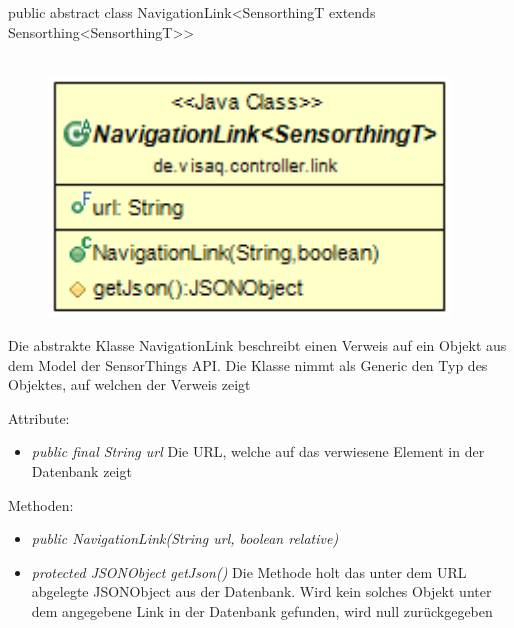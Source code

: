 public abstract class NavigationLink<SensorthingT extends Sensorthing<SensorthingT>>
\\\\
\begin{minipage}{0.3\textwidth}
    \begin{figure}[H]
        {\centering\includegraphics[width=0.95\textwidth]{media/backend/controller/classes/NavigationLink.png}}
    \end{figure}
    \end{minipage} \hfill
\begin{minipage}{0.7\textwidth}
    Die abstrakte Klasse NavigationLink beschreibt einen Verweis auf ein Objekt aus dem Model der \gls{SensorThings API}.
    Die Klasse nimmt als Generic den Typ des Objektes, auf welchen der Verweis zeigt
\end{minipage}

Attribute:
\begin{itemize}
    \item \emph{public final String url} Die URL, welche auf das verwiesene Element in der Datenbank zeigt
\end{itemize}
Methoden:
\begin{itemize}
    \item \emph{public NavigationLink(String url, boolean relative)}
    \relativeDescription
    \item \emph{protected JSONObject getJson()} Die Methode holt das unter dem URL abgelegte JSONObject aus der Datenbank.
    Wird kein solches Objekt unter dem angegebene Link in der Datenbank gefunden, wird null zurückgegeben
\end{itemize}


